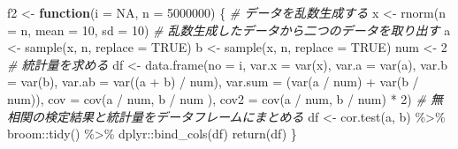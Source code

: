 \documentclass[a4paper]{tufte-handout}
\newenvironment{Shaded}{}{}
\newcommand{\AttributeTok}[1]{\textcolor[rgb]{0.49,0.56,0.16}{#1}}
\newcommand{\CommentTok}[1]{\textcolor[rgb]{0.38,0.63,0.69}{\textit{#1}}}
\newcommand{\ConstantTok}[1]{\textcolor[rgb]{0.53,0.00,0.00}{#1}}
\newcommand{\ControlFlowTok}[1]{\textcolor[rgb]{0.00,0.44,0.13}{\textbf{#1}}}
\newcommand{\DecValTok}[1]{\textcolor[rgb]{0.25,0.63,0.44}{#1}}
\newcommand{\FunctionTok}[1]{\textcolor[rgb]{0.02,0.16,0.49}{#1}}
\newcommand{\NormalTok}[1]{#1}
\newcommand{\OtherTok}[1]{\textcolor[rgb]{0.00,0.44,0.13}{#1}}
\newcommand{\SpecialCharTok}[1]{\textcolor[rgb]{0.25,0.44,0.63}{#1}}
\begin{document}
\begin{Shaded}
\begin{Highlighting}[numbers=left,,]
\NormalTok{f2 }\OtherTok{\textless{}{-}} \ControlFlowTok{function}\NormalTok{(}\AttributeTok{i =} \ConstantTok{NA}\NormalTok{, }\AttributeTok{n =} \DecValTok{5000000}\NormalTok{) \{}
  \CommentTok{\# データを乱数生成する}
\NormalTok{  x }\OtherTok{\textless{}{-}} \FunctionTok{rnorm}\NormalTok{(}\AttributeTok{n =}\NormalTok{ n, }\AttributeTok{mean =} \DecValTok{10}\NormalTok{, }\AttributeTok{sd =} \DecValTok{10}\NormalTok{)}
  \CommentTok{\# 乱数生成したデータから二つのデータを取り出す}
\NormalTok{  a }\OtherTok{\textless{}{-}} \FunctionTok{sample}\NormalTok{(x, n, }\AttributeTok{replace =} \ConstantTok{TRUE}\NormalTok{)}
\NormalTok{  b }\OtherTok{\textless{}{-}} \FunctionTok{sample}\NormalTok{(x, n, }\AttributeTok{replace =} \ConstantTok{TRUE}\NormalTok{)}
\NormalTok{  num }\OtherTok{\textless{}{-}} \DecValTok{2}
  \CommentTok{\# 統計量を求める}
\NormalTok{  df }\OtherTok{\textless{}{-}} \FunctionTok{data.frame}\NormalTok{(}\AttributeTok{no =}\NormalTok{ i,}
                   \AttributeTok{var.x =} \FunctionTok{var}\NormalTok{(x),}
                   \AttributeTok{var.a =} \FunctionTok{var}\NormalTok{(a), }\AttributeTok{var.b =} \FunctionTok{var}\NormalTok{(b),}
                   \AttributeTok{var.ab =} \FunctionTok{var}\NormalTok{((a }\SpecialCharTok{+}\NormalTok{ b) }\SpecialCharTok{/}\NormalTok{ num), }\AttributeTok{var.sum =}\NormalTok{ (}\FunctionTok{var}\NormalTok{(a }\SpecialCharTok{/}\NormalTok{ num) }\SpecialCharTok{+} \FunctionTok{var}\NormalTok{(b }\SpecialCharTok{/}\NormalTok{ num)),}
                   \AttributeTok{cov =} \FunctionTok{cov}\NormalTok{(a }\SpecialCharTok{/}\NormalTok{ num, b }\SpecialCharTok{/}\NormalTok{ num ),}
                   \AttributeTok{cov2 =} \FunctionTok{cov}\NormalTok{(a }\SpecialCharTok{/}\NormalTok{ num, b }\SpecialCharTok{/}\NormalTok{ num) }\SpecialCharTok{*} \DecValTok{2}\NormalTok{)}
  \CommentTok{\# 無相関の検定結果と統計量をデータフレームにまとめる}
\NormalTok{  df }\OtherTok{\textless{}{-}} \FunctionTok{cor.test}\NormalTok{(a, b) }\SpecialCharTok{\%\textgreater{}\%}\NormalTok{ broom}\SpecialCharTok{::}\FunctionTok{tidy}\NormalTok{() }\SpecialCharTok{\%\textgreater{}\%}\NormalTok{ dplyr}\SpecialCharTok{::}\FunctionTok{bind\_cols}\NormalTok{(df)}
  \FunctionTok{return}\NormalTok{(df)}
\NormalTok{\}}
\end{Highlighting}
\end{Shaded}

\newpage
\end{document}
